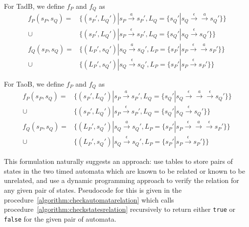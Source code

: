 For TadB, we define $f_P$ and $f_Q$ as
\begin{align*}
  f_P(s_P, s_Q) = & \{(s_P', L_Q') | s_P \xrightarrow{a} s_P', 
  L_Q=\{ s_Q' | s_Q \xrightarrow{\epsilon}\xrightarrow{a} s_Q'\}\} \\
  \cup & \{(s_P', L_Q') | s_P \xrightarrow{\epsilon} s_P', 
  L_Q=\{ s_Q' | s_Q \xrightarrow{\epsilon} s_Q'\}\} \\
  f_Q(s_P, s_Q) = & \{(L_P', s_Q') | s_Q \xrightarrow{a} s_Q', 
  L_P=\{ s_P' | s_P \xrightarrow{\epsilon}\xrightarrow{a} s_P'\}\} \\
  \cup & \{(L_P', s_Q') | s_Q \xrightarrow{\epsilon} s_Q', 
  L_P=\{ s_P' | s_P \xrightarrow{\epsilon} s_P'\}\} 
\end{align*}

For TaoB, we define $f_P$ and $f_Q$ as
\begin{align*}
  f_P(s_P, s_Q) = & \{(s_P', L_Q') | s_P \xrightarrow{a} s_P', 
  L_Q=\{ s_Q' | s_Q \xrightarrow{\epsilon}\xrightarrow{a}\xrightarrow{\epsilon} s_Q'\}\} \\
  \cup & \{(s_P', L_Q') | s_P \xrightarrow{\epsilon} s_P', 
  L_Q=\{ s_Q' | s_Q \xrightarrow{\epsilon} s_Q'\}\} \\
  f_Q(s_P, s_Q) = & \{(L_P', s_Q') | s_Q \xrightarrow{a} s_Q', 
  L_P=\{ s_P' | s_P \xrightarrow{\epsilon}\xrightarrow{a}\xrightarrow{\epsilon} s_P'\}\} \\
  \cup & \{(L_P', s_Q') | s_Q \xrightarrow{\epsilon} s_Q', 
  L_P=\{ s_P' | s_P \xrightarrow{\epsilon} s_P'\}\} 
\end{align*}

This formulation naturally suggests an approach: use tables to store
pairs of states in the two timed automata which are known to be
related or known to be unrelated, and use a dynamic programming
approach to verify the relation for any given pair of
states. Pseudocode for this is given in the
procedure~\ref{algorithm:checkautomatarelation} which calls
procedure~\ref{algorithm:checkstatesrelation} recursively to return
either \texttt{true} or \texttt{false} for the given pair of automata.

